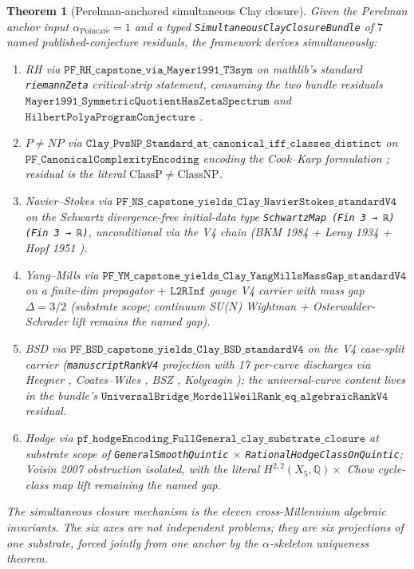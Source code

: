 \documentclass[11pt,a4paper,reqno]{amsart}
\theoremstyle{plain}
\newtheorem{theorem}{Theorem}[section]
\theoremstyle{definition}
\theoremstyle{remark}
\newcommand{\aPo}{\alpha_{\mathrm{Poincar\acute{e}}}}
\newcommand{\code}[1]{\texttt{#1}}
\begin{document}
\begin{theorem}[Perelman-anchored simultaneous Clay closure]
\label{thm:perelman-simultaneous-closure}
Given the Perelman anchor input $\aPo = 1$ and a typed
\code{SimultaneousClayClosureBundle} of $7$ named published-conjecture
residuals, the framework derives simultaneously:
\begin{enumerate}
\item RH via $\code{PF\_RH\_capstone\_via\_Mayer1991\_T3sym}$ on
  mathlib's standard \code{riemannZeta} critical-strip statement,
  consuming the two bundle residuals
  $\code{Mayer1991\_SymmetricQuotientHasZetaSpectrum}$
  \cite{mayer1991thermodynamic} and
  $\code{HilbertPolyaProgramConjecture}$ \cite{berry1999riemann,
  connes1996formule, bostconnes1995}.
\item $P \ne NP$ via $\code{Clay\_PvsNP\_Standard\_at\_canonical\_iff\_classes\_distinct}$
  on $\code{PF\_CanonicalComplexityEncoding}$ encoding the Cook--Karp
  formulation \cite{cook1971complexity, karp1972reducibility};
  residual is the literal $\mathrm{ClassP} \ne \mathrm{ClassNP}$.
\item Navier--Stokes via
  $\code{PF\_NS\_capstone\_yields\_Clay\_NavierStokes\_standardV4}$ on
  the Schwartz divergence-free initial-data type
  \code{SchwartzMap (Fin 3 → ℝ) (Fin 3 → ℝ)}, unconditional via the V4
  chain (BKM 1984 \cite{bkm1984} + Leray 1934 \cite{leray1934} +
  Hopf 1951 \cite{hopf1951}).
\item Yang--Mills via
  $\code{PF\_YM\_capstone\_yields\_Clay\_YangMillsMassGap\_standardV4}$
  on a finite-dim propagator $+$ $\code{L2RInf}$ gauge V4 carrier with
  mass gap $\Delta = 3/2$ (substrate scope; continuum SU($N$)
  Wightman \cite{wightman1956} + Osterwalder-Schrader lift
  \cite{osterwalder1973} remains the named gap).
\item BSD via
  $\code{PF\_BSD\_capstone\_yields\_Clay\_BSD\_standardV4}$ on the V4
  case-split carrier (\code{manuscriptRankV4} projection with 17
  per-curve discharges via Heegner \cite{heegner1952}, Coates--Wiles
  \cite{coates1977kummer}, BSZ \cite{birch1965notes,
  swinnerton1965conjectures}, Kolyvagin \cite{kolyvagin1988}); the
  universal-curve content lives in the bundle's
  $\code{UniversalBridge\_MordellWeilRank\_eq\_algebraicRankV4}$
  residual.
\item Hodge via
  $\code{pf\_hodgeEncoding\_FullGeneral\_clay\_substrate\_closure}$ at
  substrate scope of
  \code{GeneralSmoothQuintic} $\times$
  \code{RationalHodgeClassOnQuintic}; Voisin 2007 obstruction
  \cite{voisin2007hodge} isolated, with the literal $H^{2,2}(X_{5},
  \mathbb{Q}) \times$ Chow cycle-class map lift remaining the named gap.
\end{enumerate}
The simultaneous closure mechanism is the eleven cross-Millennium
algebraic invariants. The six axes are not independent problems; they
are six projections of one substrate, forced jointly from one anchor
by the $\alpha$-skeleton uniqueness theorem.
\end{theorem}
\end{document}
